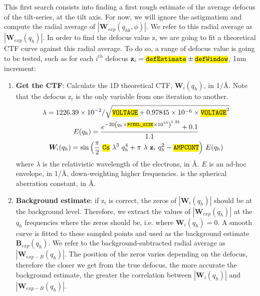 This first search consists into finding a first rough estimate of the average defocus of the tilt-series, at the tilt axis. For now, we will ignore the astigmatism and compute the radial average of $|\bm{W}_{exp}(q_{hk},\phi)|$. We refer to this radial average as $|\bm{W}_{exp}(q_{h})|$. In order to find the defocus value $\bm{\mathrm{z}}$, we are going to fit a theoretical CTF curve against this radial average. To do so, a range of defocus value is going to be tested, such as for each $i^{th}$ defocus $\bm{\mathrm{z}}_{i} = \code{defEstimate} \pm \code{defWindow}$, 1nm increment:
\begin{enumerate}
    \item \textbf{Get the CTF}: Calculate the 1D theoretical CTF, $\bm{W}_{i}(q_{h})$, in 1/\si{\angstrom}. Note that the defocus $\bm{\mathrm{z}}_i$ is the only variable from one iteration to another.
    \begin{gather}
        \lambda = {1226.39\times10^{-2}}/{\sqrt{\code{VOLTAGE} + 0.97845\times10^{-6}\times\code{VOLTAGE}^2}}\notag\\
        E(q_h) = \frac{ e^{ -20{\left( q_h \times \code{PIXEL\_SIZE}\times10^{10} \right)}^{1.25}} + 0.1 } {1.1}\notag\\
        \bm{W}_{i}(q_h) = \sin{ \left( \frac{\pi}{2}\ \code{Cs}\ \lambda^{3}\ q_h^4 + \pi\ \lambda\ \bm{\mathrm{z}}_i\ q_h^2 - \code{AMPCONT} \right)}\ E(q_h)\label{eq:ctf}
    \end{gather} %
    where $\lambda$ is the relativistic wavelength of the electrons, in \si{\angstrom}. $E$ is an ad-hoc envelope, in 1/\si{\angstrom}, down-weighting higher frequencies.  is the spherical aberration constant, in \si{\angstrom}.
        
    \item \textbf{Background estimate}: if $\bm{\mathrm{z}}_i$ is correct, the zeros of $|\bm{W}_i(q_h)|$ should be at the background level. Therefore, we extract the values of $|\bm{W}_{exp}(q_h)|$ at the $q_h$ frequencies where the zeros should be, i.e. where $\bm{W}_i(q_h)=0$. A smooth curve is fitted to these sampled points and used as the background estimate $\bm{B}_{exp}(q_h)$. We refer to the background-subtracted radial average as $|\bm{W}_{exp-B}(q_h)|$. The position of the zeros varies depending on the defocus, therefore the closer we get from the true defocus, the more accurate the background estimate, the greater the correlation between $|\bm{W}_i(q_h)|$ and $|\bm{W}_{exp-B}(q_h)|$.
        

\end{enumerate}
